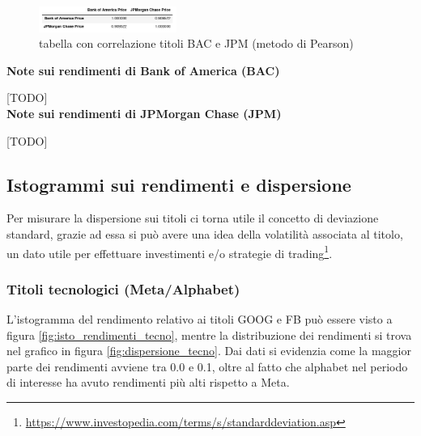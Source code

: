 \documentclass{article}
\begin{document}
\begin{figure}[h]
  \centering
  \includegraphics[width=0.4\textwidth]{corr_banc.png}
  \caption{tabella con correlazione titoli BAC e JPM (metodo di Pearson)}
  \label{fig:corr_banc}
\end{figure}

\textbf{Note sui rendimenti di Bank of America (BAC)}

[TODO]\\

\textbf{Note sui rendimenti di JPMorgan Chase (JPM)}

[TODO]

\pagebreak

\subsection{Istogrammi sui rendimenti e dispersione}

Per misurare la dispersione sui titoli ci torna utile il concetto di deviazione standard, grazie ad essa si può avere una idea della
 volatilità associata al titolo, un dato utile per effettuare investimenti e/o strategie di 
trading\footnote{
  \href{https://www.investopedia.com/terms/s/standarddeviation.asp}{https://www.investopedia.com/terms/s/standarddeviation.asp}
}.\\

\subsubsection{Titoli tecnologici (Meta/Alphabet)}

L'istogramma del rendimento relativo ai titoli GOOG e FB può essere visto a figura \ref{fig:isto_rendimenti_tecno}, mentre la distribuzione dei 
rendimenti si trova nel grafico in figura \ref{fig:dispersione_tecno}.
Dai dati si evidenzia come la maggior parte dei rendimenti avviene tra 0.0 e 0.1, oltre al fatto che alphabet nel periodo di interesse ha avuto rendimenti più alti
rispetto a Meta.
\end{document}
